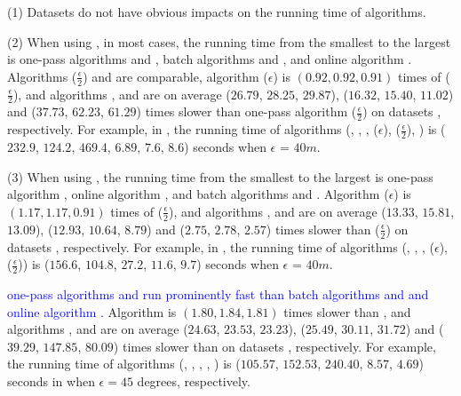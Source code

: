 \sstab (1) {Datasets do not have obvious impacts on the running time of \lsa algorithms.}

\sstab (2) When using \ped, in most cases, the running time from the smallest to the largest is one-pass algorithms \siped and \operb, batch algorithms \tpa and \dpa, and online algorithm \bqsa.
Algorithms \siped($\frac{\epsilon}{2}$) and \operb are comparable, algorithm \siped(${\epsilon}$) is $(0.92, 0.92, 0.91)$ times of \siped($\frac{\epsilon}{2}$), and algorithms \tpa, \dpa and \bqsa are on average
($26.79$, $28.25$, $29.87$), ($16.32$, $15.40$, $11.02$) and ($37.73$, $62.23$, $61.29$)
times slower than one-pass algorithm \siped($\frac{\epsilon}{2}$) on datasets \dSets, respectively.
%
For example, in \mopsi, the running time of algorithms
(\tpa, \dpa, \bqsa, \siped(${\epsilon}$), \siped($\frac{\epsilon}{2}$), \operb ) is ($232.9$, $124.2$, $469.4$, $6.89$, $7.6$, $8.6$) seconds when $\epsilon$ = $40m$.

\sstab (3) When using \sed, the running time from the smallest to the largest is one-pass algorithm \cised, online algorithm \squishe, and batch algorithms \tpa and \dpa. Algorithm \cised(${\epsilon}$) is $(1.17, 1.17, 0.91)$ times of \cised($\frac{\epsilon}{2}$), and algorithms \tpa, \dpa and \squishe are on average
($13.33$, $15.81$, $13.09$), ($12.93$, $10.64$, $8.79$) and
($2.75$, $2.78$, $2.57$) times slower than \cised($\frac{\epsilon}{2}$) on datasets \dSets, respectively.
%
For example, in \mopsi, the running time of algorithms
(\tpa, \dpa, \squishe, \cised($\epsilon$), \cised($\frac{\epsilon}{2}$)) is ($156.6$, $104.8$, $27.2$, $11.6$, $9.7$) seconds when $\epsilon$ = $40m$.

 \textcolor{blue}{one-pass algorithms \intersec and \interval run prominently fast than batch algorithms \tpa and \dpa and online algorithm \opwa.}
%
%
Algorithm \interval is $(1.80, 1.84, 1.81)$ times slower than \intersec, and algorithms \tpa, \dpa and \opwa are on average
($24.63$, $23.53$, $23.23$), ($25.49$, $30.11$, $31.72$) and ($39.29$, $147.85$, $80.09$)
times slower than \intersec on datasets \dSets, respectively.
%
For example, the running time of algorithms
(\tpa, \dpa, \opwa, \interval, \intersec) is ($105.57$, $152.53$, $240.40$, $8.57$, $4.69$) seconds in \mopsi when
$\epsilon=45$ degrees, respectively.




